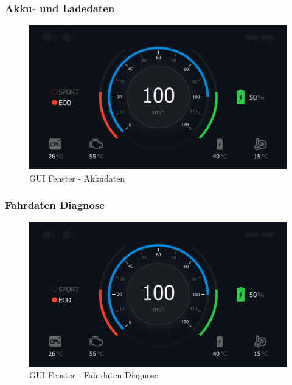 \newpage

\subsubsection{Akku- und Ladedaten}

\begin{figure}[H]
	\begin{center}
		\includegraphics[scale=0.24]{figures/hcis/window_dashboard.png}
			\caption{GUI Fenster - Akkudaten}
			\label{fig:pageAkku}
	\end{center}
\end{figure}

\subsubsection{Fahrdaten Diagnose}

\begin{figure}[H]
	\begin{center}
		\includegraphics[scale=0.24]{figures/hcis/window_dashboard.png}
			\caption{GUI Fenster - Fahrdaten Diagnose}
			\label{fig:pageDiagnose}
	\end{center}
\end{figure}

